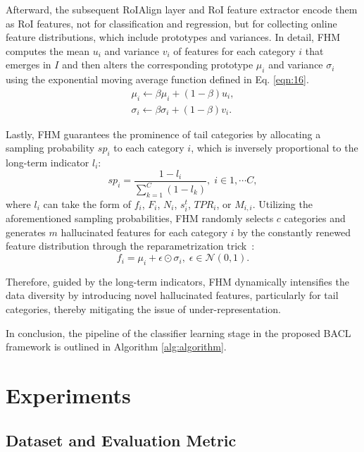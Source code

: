 \documentclass[lettersize,journal]{IEEEtran}
\begin{document}
Afterward, the subsequent RoIAlign layer and RoI feature extractor encode them as RoI features, not for classification and regression, but for collecting online feature distributions, which include prototypes and variances.
In detail, FHM computes the mean $u_i$ and variance $v_i$ of features for each category $i$ that emerges in $I$ and then alters the corresponding prototype $\mu_i$ and variance $\sigma_i$ using the exponential moving average function defined in Eq. \eqref{eqn:16}.
\begin{equation}
    \begin{aligned}\label{eqn:16}
        \mu_{i}\leftarrow \beta\mu_{i}+(1-\beta)u_i,\\
        \sigma_{i}\leftarrow \beta\sigma_{i}+(1-\beta)v_i.
    \end{aligned}
\end{equation}


Lastly, FHM guarantees the prominence of tail categories by allocating a sampling probability $sp_i$ to each category $i$, which is inversely proportional to the long-term indicator $l_i$:
\begin{equation}\label{eqn:17}
    sp_i=\frac{1-l_i}{\sum\limits_{k=1}^{C}(1-l_k)}, \; i \in1,\cdots C,
\end{equation}
where $l_i$ can take the form of $f_i$, $F_i$, $N_i$, $s_i^t$, $T\!P\!R_i$, or $M_{i,i}$.
Utilizing the aforementioned sampling probabilities, FHM randomly selects $c$ categories and generates $m$ hallucinated features for each category $i$ by the constantly renewed feature distribution through the reparametrization trick~\cite{kingma2013auto}:
\begin{equation}
    f_i=\mu_i+\epsilon\odot\sigma_i, \; \epsilon\in \mathcal{N}(0,1).
\end{equation}

Therefore, guided by the long-term indicators, FHM dynamically intensifies the data diversity by introducing novel hallucinated features, particularly for tail categories, thereby mitigating the issue of under-representation.

In conclusion, the pipeline of the classifier learning stage in the proposed BACL framework is outlined in Algorithm \ref{alg:algorithm}.



\section{Experiments}

\subsection{Dataset and Evaluation Metric}
\end{document}
